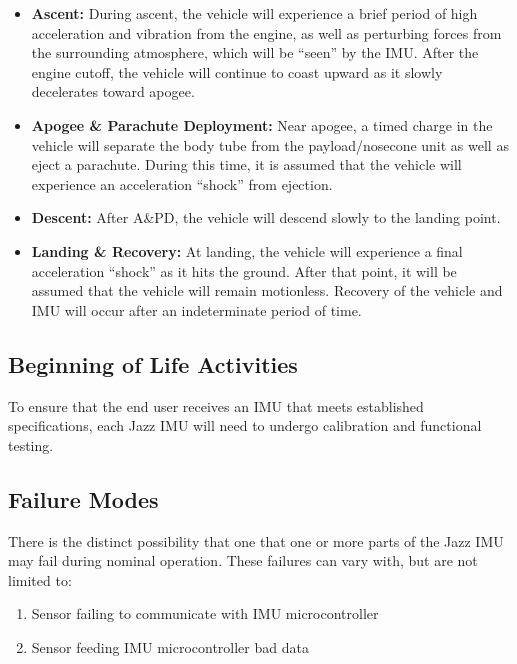 \documentclass[14pt,a4paper]{article}
\begin{document}
\begin{CenturySchool}
\begin{itemize}
		\item{\bfseries Ascent:} During ascent, the vehicle will experience a brief period of high acceleration and vibration from the engine, as well as perturbing forces from the surrounding atmosphere, which will be “seen” by the IMU. After the engine cutoff, the vehicle will continue to coast upward as it slowly decelerates toward apogee.
		
		\item{\bfseries Apogee \& Parachute Deployment:} Near apogee, a timed charge in the vehicle will separate the body tube from the payload/nosecone unit as well as eject a parachute. During this time, it is assumed that the vehicle will experience an acceleration “shock” from ejection.
		
		\item{\bfseries Descent:} After A\&PD, the vehicle will descend slowly to the landing point.
		
		\item{\bfseries Landing \& Recovery:} At landing, the vehicle will experience a final acceleration “shock” as it hits the ground. After that point, it will be assumed that the vehicle will remain motionless. Recovery of the vehicle and IMU will occur after an indeterminate period of time.
		
		\end{itemize}
		
		\subsection{Beginning of Life Activities} 
		To ensure that the end user receives an IMU that meets established specifications, each Jazz IMU will need to undergo calibration and functional testing.
		
		\subsection{Failure Modes}
		There is the distinct possibility that one that one or more parts of the Jazz IMU may fail during nominal operation. These failures can vary with, but are not limited to:
		
		\begin{enumerate}
			\item{Sensor failing to communicate with IMU microcontroller}
			
			\item{Sensor feeding IMU microcontroller bad data}
			

\end{enumerate}
\end{CenturySchool}
\end{document}
